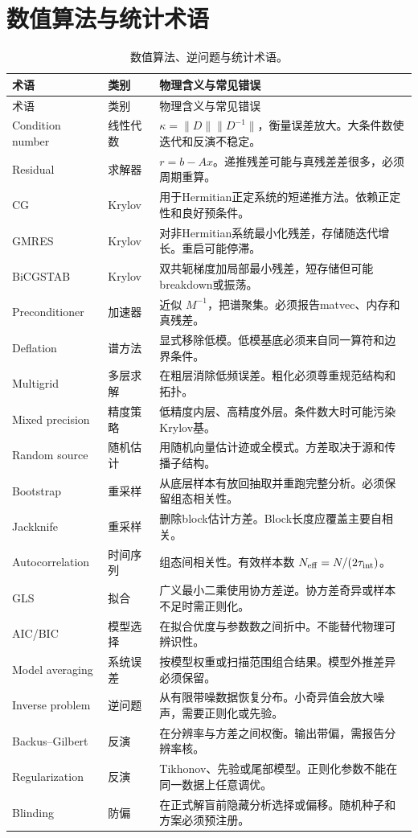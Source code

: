 \documentclass[UTF8,12pt,a4paper,twoside,openany]{ctexbook}
\begin{document}
\section{数值算法与统计术语}

{\small
\begin{longtable}{L{2.8cm}L{1.9cm}L{8.7cm}}
\caption{数值算法、逆问题与统计术语。}\label{tab:glossary-numerics}\\
\toprule
术语 & 类别 & 物理含义与常见错误 \\
\midrule
\endfirsthead
\toprule
术语 & 类别 & 物理含义与常见错误 \\
\midrule
\endhead
\bottomrule
\endfoot
Condition number & 线性代数 & \(\kappa=\|D\|\|D^{-1}\|\)，衡量误差放大。大条件数使迭代和反演不稳定。 \\
Residual & 求解器 & \(r=b-Ax\)。递推残差可能与真残差差很多，必须周期重算。 \\
CG & Krylov & 用于Hermitian正定系统的短递推方法。依赖正定性和良好预条件。 \\
GMRES & Krylov & 对非Hermitian系统最小化残差，存储随迭代增长。重启可能停滞。 \\
BiCGSTAB & Krylov & 双共轭梯度加局部最小残差，短存储但可能breakdown或振荡。 \\
Preconditioner & 加速器 & 近似 \(M^{-1}\)，把谱聚集。必须报告matvec、内存和真残差。 \\
Deflation & 谱方法 & 显式移除低模。低模基底必须来自同一算符和边界条件。 \\
Multigrid & 多层求解 & 在粗层消除低频误差。粗化必须尊重规范结构和拓扑。 \\
Mixed precision & 精度策略 & 低精度内层、高精度外层。条件数大时可能污染Krylov基。 \\
Random source & 随机估计 & 用随机向量估计迹或全模式。方差取决于源和传播子结构。 \\
Bootstrap & 重采样 & 从底层样本有放回抽取并重跑完整分析。必须保留组态相关性。 \\
Jackknife & 重采样 & 删除block估计方差。Block长度应覆盖主要自相关。 \\
Autocorrelation & 时间序列 & 组态间相关性。有效样本数 \(N_{\rm eff}=N/(2\tau_{\rm int})\)。 \\
GLS & 拟合 & 广义最小二乘使用协方差逆。协方差奇异或样本不足时需正则化。 \\
AIC/BIC & 模型选择 & 在拟合优度与参数数之间折中。不能替代物理可辨识性。 \\
Model averaging & 系统误差 & 按模型权重或扫描范围组合结果。模型外推差异必须保留。 \\
Inverse problem & 逆问题 & 从有限带噪数据恢复分布。小奇异值会放大噪声，需要正则化或先验。 \\
Backus--Gilbert & 反演 & 在分辨率与方差之间权衡。输出带偏，需报告分辨率核。 \\
Regularization & 反演 & Tikhonov、先验或尾部模型。正则化参数不能在同一数据上任意调优。 \\
Blinding & 防偏 & 在正式解盲前隐藏分析选择或偏移。随机种子和方案必须预注册。 \\
\end{longtable}
}
\end{document}
